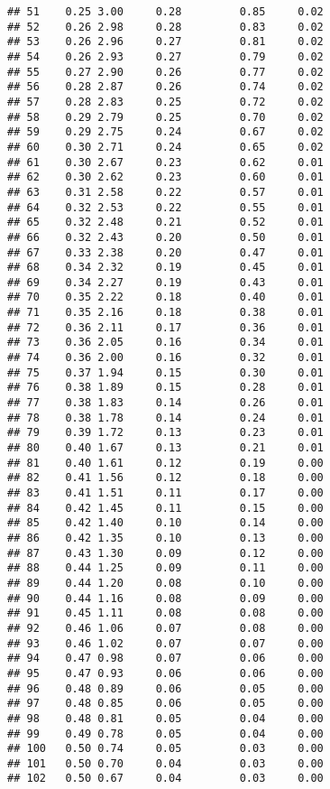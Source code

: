 \documentclass[
]{article}
\begin{document}
\begin{verbatim}
## 51    0.25 3.00     0.28         0.85     0.02
## 52    0.26 2.98     0.28         0.83     0.02
## 53    0.26 2.96     0.27         0.81     0.02
## 54    0.26 2.93     0.27         0.79     0.02
## 55    0.27 2.90     0.26         0.77     0.02
## 56    0.28 2.87     0.26         0.74     0.02
## 57    0.28 2.83     0.25         0.72     0.02
## 58    0.29 2.79     0.25         0.70     0.02
## 59    0.29 2.75     0.24         0.67     0.02
## 60    0.30 2.71     0.24         0.65     0.02
## 61    0.30 2.67     0.23         0.62     0.01
## 62    0.30 2.62     0.23         0.60     0.01
## 63    0.31 2.58     0.22         0.57     0.01
## 64    0.32 2.53     0.22         0.55     0.01
## 65    0.32 2.48     0.21         0.52     0.01
## 66    0.32 2.43     0.20         0.50     0.01
## 67    0.33 2.38     0.20         0.47     0.01
## 68    0.34 2.32     0.19         0.45     0.01
## 69    0.34 2.27     0.19         0.43     0.01
## 70    0.35 2.22     0.18         0.40     0.01
## 71    0.35 2.16     0.18         0.38     0.01
## 72    0.36 2.11     0.17         0.36     0.01
## 73    0.36 2.05     0.16         0.34     0.01
## 74    0.36 2.00     0.16         0.32     0.01
## 75    0.37 1.94     0.15         0.30     0.01
## 76    0.38 1.89     0.15         0.28     0.01
## 77    0.38 1.83     0.14         0.26     0.01
## 78    0.38 1.78     0.14         0.24     0.01
## 79    0.39 1.72     0.13         0.23     0.01
## 80    0.40 1.67     0.13         0.21     0.01
## 81    0.40 1.61     0.12         0.19     0.00
## 82    0.41 1.56     0.12         0.18     0.00
## 83    0.41 1.51     0.11         0.17     0.00
## 84    0.42 1.45     0.11         0.15     0.00
## 85    0.42 1.40     0.10         0.14     0.00
## 86    0.42 1.35     0.10         0.13     0.00
## 87    0.43 1.30     0.09         0.12     0.00
## 88    0.44 1.25     0.09         0.11     0.00
## 89    0.44 1.20     0.08         0.10     0.00
## 90    0.44 1.16     0.08         0.09     0.00
## 91    0.45 1.11     0.08         0.08     0.00
## 92    0.46 1.06     0.07         0.08     0.00
## 93    0.46 1.02     0.07         0.07     0.00
## 94    0.47 0.98     0.07         0.06     0.00
## 95    0.47 0.93     0.06         0.06     0.00
## 96    0.48 0.89     0.06         0.05     0.00
## 97    0.48 0.85     0.06         0.05     0.00
## 98    0.48 0.81     0.05         0.04     0.00
## 99    0.49 0.78     0.05         0.04     0.00
## 100   0.50 0.74     0.05         0.03     0.00
## 101   0.50 0.70     0.04         0.03     0.00
## 102   0.50 0.67     0.04         0.03     0.00

\end{verbatim}
\end{document}
